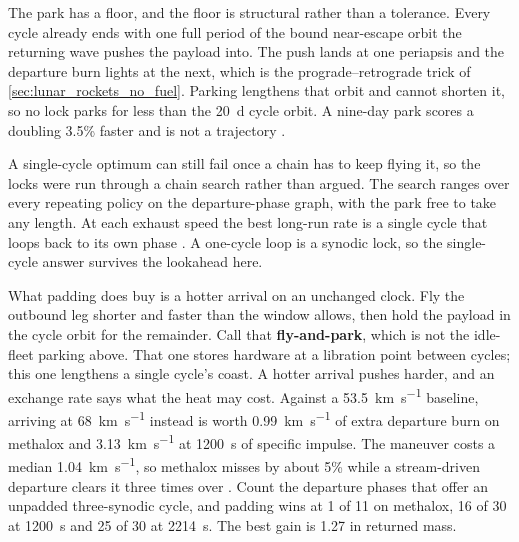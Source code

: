 \documentclass{article}
\begin{document}
The park has a floor, and the floor is structural rather than a tolerance. Every cycle already ends with one full period of the bound near-escape orbit the returning wave pushes the payload into. The push lands at one periapsis and the departure burn lights at the next, which is the prograde--retrograde trick of \autoref{sec:lunar_rockets_no_fuel}. Parking lengthens that orbit and cannot shorten it, so no lock parks for less than the \SI{20}{\day} cycle orbit. A nine-day park scores a doubling 3.5\% faster and is not a trajectory \cite{Katz_aim_is_all_you_need_2025}.

A single-cycle optimum can still fail once a chain has to keep flying it, so the locks were run through a chain search rather than argued. The search ranges over every repeating policy on the departure-phase graph, with the park free to take any length. At each exhaust speed the best long-run rate is a single cycle that loops back to its own phase \cite{Katz_aim_is_all_you_need_2025}. A one-cycle loop is a synodic lock, so the single-cycle answer survives the lookahead here.

What padding does buy is a hotter arrival on an unchanged clock. Fly the outbound leg shorter and faster than the window allows, then hold the payload in the cycle orbit for the remainder. Call that \textbf{fly-and-park}, which is not the idle-fleet parking above. That one stores hardware at a libration point between cycles; this one lengthens a single cycle's coast. A hotter arrival pushes harder, and an exchange rate says what the heat may cost. Against a \SI{53.5}{\kilo\meter\per\second} baseline, arriving at \SI{68}{\kilo\meter\per\second} instead is worth \SI{0.99}{\kilo\meter\per\second} of extra departure burn on methalox and \SI{3.13}{\kilo\meter\per\second} at \SI{1200}{\second} of specific impulse. The maneuver costs a median \SI{1.04}{\kilo\meter\per\second}, so methalox misses by about 5\% while a stream-driven departure clears it three times over \cite{Katz_aim_is_all_you_need_2025}. Count the departure phases that offer an unpadded three-synodic cycle, and padding wins at 1 of 11 on methalox, 16 of 30 at \SI{1200}{\second} and 25 of 30 at \SI{2214}{\second}. The best gain is \num{1.27} in returned mass.
\end{document}
